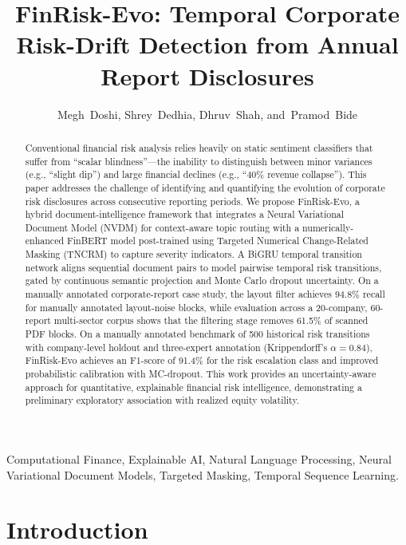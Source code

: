 \documentclass[journal]{IEEEtran}
\begin{document}
\title{FinRisk-Evo: Temporal Corporate Risk-Drift Detection from Annual Report Disclosures}

\author{Megh~Doshi,
        Shrey~Dedhia,
        Dhruv~Shah,
        and~Pramod~Bide}

\maketitle

\begin{abstract}
Conventional financial risk analysis relies heavily on static sentiment classifiers that suffer from ``scalar blindness''---the inability to distinguish between minor variances (e.g., ``slight dip'') and large financial declines (e.g., ``40\% revenue collapse''). This paper addresses the challenge of identifying and quantifying the evolution of corporate risk disclosures across consecutive reporting periods. We propose FinRisk-Evo, a hybrid document-intelligence framework that integrates a Neural Variational Document Model (NVDM) for context-aware topic routing with a numerically-enhanced FinBERT model post-trained using Targeted Numerical Change-Related Masking (TNCRM) to capture severity indicators. A BiGRU temporal transition network aligns sequential document pairs to model pairwise temporal risk transitions, gated by continuous semantic projection and Monte Carlo dropout uncertainty. On a manually annotated corporate-report case study, the layout filter achieves 94.8\% recall for manually annotated layout-noise blocks, while evaluation across a 20-company, 60-report multi-sector corpus shows that the filtering stage removes 61.5\% of scanned PDF blocks. On a manually annotated benchmark of 500 historical risk transitions with company-level holdout and three-expert annotation (Krippendorff's $\alpha = 0.84$), FinRisk-Evo achieves an F1-score of 91.4\% for the risk escalation class and improved probabilistic calibration with MC-dropout. This work provides an uncertainty-aware approach for quantitative, explainable financial risk intelligence, demonstrating a preliminary exploratory association with realized equity volatility.
\end{abstract}

\begin{IEEEkeywords}
Computational Finance, Explainable AI, Natural Language Processing, Neural Variational Document Models, Targeted Masking, Temporal Sequence Learning.
\end{IEEEkeywords}

\section{Introduction}
\end{document}
